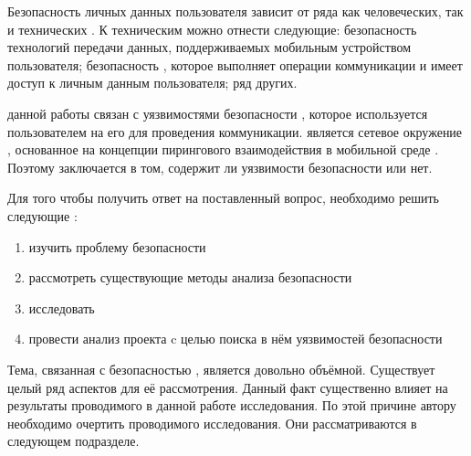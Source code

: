 %
Безопасность личных данных пользователя зависит от ряда как человеческих, так и технических  .
%
К техническим можно отнести следующие: безопасность технологий передачи данных, поддерживаемых мобильным устройством пользователя; безопасность , которое выполняет операции коммуникации и имеет доступ к личным данным пользователя; ряд других.

%
 данной работы связан с уязвимостями безопасности , которое используется пользователем на его  для проведения коммуникации. 
%
 является сетевое окружение , основанное на концепции пирингового взаимодействия  в мобильной среде .
%
Поэтому  заключается в том, содержит ли  уязвимости безопасности или нет.

%
Для того чтобы получить ответ на поставленный вопрос, необходимо решить следующие :
\begin{enumerate}
	\item изучить проблему безопасности 
	\item рассмотреть существующие методы анализа безопасности 
	\item исследовать  
	\item провести анализ проекта  c целью поиска в нём уязвимостей безопасности 
\end{enumerate}

%
Тема, связанная с безопасностью , является довольно объёмной.
%
Существует целый ряд аспектов для её рассмотрения. 
%
Данный факт существенно влияет на результаты проводимого в данной работе исследования.
%
По этой причине автору необходимо очертить  проводимого исследования. 
%
Они рассматриваются в следующем подразделе. 

